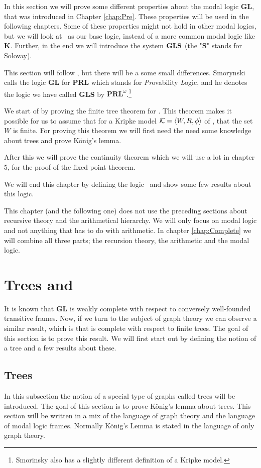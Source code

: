 \documentclass[../main.tex]{subfiles}
\begin{document}
In this section we will prove some different properties about the modal logic
\textbf{GL}, that was introduced in Chapter \ref{chap:Pre}.
These properties will be used in the following chapters. Some of these
properties might not
hold in other modal logics, but we will look at \GL\ as our base logic,
instead of a more common modal logic like \textbf{K}.
Further, in the end we will introduce the system $\text{\textbf{GLS}}$ (the
"\textbf{S}" stands for Solovay).

This section will follow \parencite{Smor1985}, but there will be a some small
differences. Smorynski calls the logic \textbf{GL} for \textbf{PRL} which
stands for \textit{Pr}ovability \textit{L}ogic, and he denotes the logic we
have called \textbf{GLS} by $\textbf{PRL}^\omega$.\footnote{Smorinsky also has a
slightly different definition of a Kripke model.}

We start of by proving the finite tree theorem for \GL. This theorem makes it
possible for us to assume that for a Kripke model $\mathcal{K}=\langle W,R,\phi\rangle$ of
\GL, that the set $W$ is finite. For proving this theorem we will first need
the need some knowledge about trees and
prove König's lemma.

After this we will prove the continuity theorem which we will use a lot in
chapter 5, for the proof of the fixed point theorem.

We will end this chapter by defining the logic \GLS\ and show some few results
about this logic.

This chapter (and the following one) does not use the preceding sections about
recursive theory and the arithmetical hierarchy. We will only
focus on modal logic and not anything that has to do with arithmetic. In
chapter \ref{chap:Complete} we will combine all three parts; the recursion
theory, the arithmetic and the modal logic.


\section{Trees and \GL}

It is known that \textbf{GL} is weakly complete with respect to conversely
well-founded transitive frames. Now, if we turn to the subject of graph theory we can observe a 
similar result, which is that \GL is complete with respect to finite trees.  The goal of this
section is to prove this result. We will first start out by defining the notion
of a tree and a few results about these.

\subsection{Trees}
In this subsection the notion of a special type of graphs called trees will be
introduced. The goal of this section is to prove König's lemma about trees. 
This section will be written in a mix of the language of graph theory and the
language of modal logic frames. Normally König's Lemma is stated in the
language of only graph theory.
\end{document}
